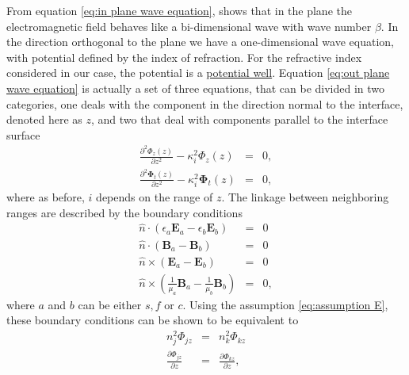 \documentclass[12pt,twoside,english]{book}
\renewcommand{\~}{\perispomeni}%
\numberwithin{equation}{section}
\numberwithin{figure}{section}
\begin{document}
From equation \ref{eq:in plane wave equation}, shows that in the plane the electromagnetic field behaves like a bi-dimensional wave with wave number $\beta$. In the direction orthogonal to the plane we have a one-dimensional wave equation, with potential defined by the index of refraction. For the refractive index considered in our case, the potential is a \href{http://en.wikipedia.org/wiki/Finite_potential_well}{potential well}. Equation \ref{eq:out plane wave equation} is actually a set of three equations, that can be divided in two categories, one deals with the component in the direction normal to the interface, denoted here as $z$, and two that deal with components parallel to the interface surface
\begin{subequations}\begin{eqnarray}
\frac{\partial^{2}\Phi_{z}\left(z\right)}{\partial z^{2}}-\kappa_i^{2}\Phi_{z}\left(z\right) & = & 0,\label{eq:wave equation zz}\\
\frac{\partial^{2}\mathbf{\Phi}_{t}\left(z\right)}{\partial z^{2}}-\kappa_i^{2}\mathbf{\Phi}_{t}\left(z\right) & = & 0,\label{eq:wave equation zt}
\end{eqnarray}\end{subequations}
where as before, $i$ depends on the range of $z$. The linkage between neighboring ranges are described by the boundary conditions
\begin{subequations}
\begin{eqnarray}
\hat{n}\cdot\left(\epsilon_{a}\mathbf{E}_{a}-\epsilon_{b}\mathbf{E}_{b}\right) & = & 0\label{eq:boundary conditions 1}\\
\hat{n}\cdot\left(\mathbf{B}_{a}-\mathbf{B}_{b}\right) & = & 0\label{eq:boundary conditions 2}\\
\hat{n}\times\left(\mathbf{E}_{a}-\mathbf{E}_{b}\right) & = & 0\label{eq:boundary conditions 3}\\
\hat{n}\times\left(\frac{1}{\mu_{a}}\mathbf{B}_{a}-\frac{1}{\mu_{b}}\mathbf{B}_{b}\right) & = & 0,\label{eq:boundary conditions 4}\end{eqnarray}
\label{eq:boundary conditions}\end{subequations}
where $a$ and $b$ can be either $s,f$ or $c$. Using the assumption \ref{eq:assumption E}, these boundary conditions can be shown to be equivalent to
\begin{subequations}\begin{eqnarray}
n_{j}^{2}\Phi_{jz} & = & n_{k}^{2}\Phi_{kz}\label{eq:boundary Ez}\\
\frac{\partial\Phi_{jz}}{\partial z} & = & \frac{\partial\Phi_{kz}}{\partial z},
\label{eq:boundary dEz}\end{eqnarray}
\label{eq:boundary E}\end{subequations}
\end{document}
